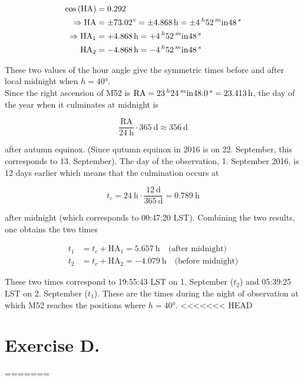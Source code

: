 \documentclass[11pt,a4paper,twoside]{article}
\begin{document}
\begin{align}
 \cos{\left( \text{HA} \right)} &= 0.292 \\
 \Rightarrow \text{HA} &= \pm \ang{73.02} = \pm \SI{4.868}{\hour} = \pm \SI{4}{^\hour} \SI{52}{^\minute} \SI{48}{^\second} \\
 \Rightarrow \text{HA}_1 &= +\SI{4.868}{\hour} = +\SI{4}{^\hour} \SI{52}{^\minute} \SI{48}{^\second} \\
 \text{HA}_2 &= -\SI{4.868}{\hour} = -\SI{4}{^\hour} \SI{52}{^\minute} \SI{48}{^\second} \\
\end{align}

These two values of the hour angle give the symmetric times before and after local midnight when $h=\ang{40}$. \\

Since the right ascension of M52 is $\text{RA} = \SI{23}{^\hour} \SI{24}{^\minute} \SI{48.0}{^\second} = \SI{23.413}{\hour}$, the day of the year when it culminates at midnight is 

\begin{equation}
 \frac{\text{RA}}{\SI{24}{\hour}} \cdot \SI{365}{\day} \approx \SI{356}{\day}
\end{equation}

after autumn equinox. (Since qutumn equinox in 2016 is on 22. September, this corresponds to 13. September). The day of the observation, 1. September 2016, is 12 days earlier which means that the culmination occurs at 

\begin{equation}
 t_c = \SI{24}{\hour} \cdot \frac{\SI{12}{\day}}{\SI{365}{\day}} = \SI{0.789}{\hour}
\end{equation}

after midnight (which corresponds to 00:47:20 LST). Combining the two results, one obtains the two times 

\begin{align}
 t_1 &= t_c + \text{HA}_1 = \SI{5.657}{\hour} \quad \text{(after midnight)} \\
 t_2 &= t_c + \text{HA}_2 = \SI{-4.079}{\hour} \quad \text{(before midnight)}
\end{align}

These two times correspond to 19:55:43 LST on 1. September ($t_2$) and 05:39:25 LST on 2. September ($t_1$). These are the times during the night of observation at which M52 reaches the positions where $h=\ang{40}$. 
<<<<<<< HEAD

\section*{Exercise D.}
=======
\end{document}
